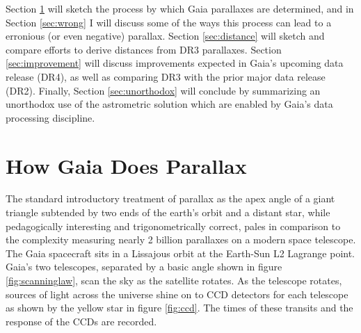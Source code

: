 \documentclass[twocolumn]{aastex631}
\begin{document}
Section \ref{sec:parallax} will sketch the process by which Gaia parallaxes are determined, and in Section \ref{sec:wrong} I will discuss some of the ways this process can lead to a erronious (or even negative) parallax.
Section \ref{sec:distance} will sketch and compare efforts to derive distances from DR3 parallaxes. Section \ref{sec:improvement} will discuss improvements expected in Gaia's upcoming data release (DR4), as well as comparing DR3 with the prior major data release (DR2). Finally, Section \ref{sec:unorthodox} will conclude by summarizing an unorthodox use of the astrometric solution which are enabled by Gaia's data processing discipline.

\section{How Gaia Does Parallax} \label{sec:parallax}

The standard introductory treatment of parallax as the apex angle of a giant triangle subtended by two ends of the earth's orbit and a distant star, while pedagogically interesting and trigonometrically correct, pales in comparison to the complexity measuring nearly 2 billion parallaxes on a modern space telescope. The Gaia spacecraft sits in a Lissajous orbit at the Earth-Sun L2 Lagrange point. Gaia's two telescopes, separated by a basic angle shown in figure \ref{fig:scanninglaw}, scan the sky as the satellite rotates. As the telescope rotates, sources of light across the universe shine on to CCD detectors for each telescope as shown by the yellow star in figure \ref{fig:ccd}. The times of these transits and the response of the CCDs are recorded.
\end{document}
